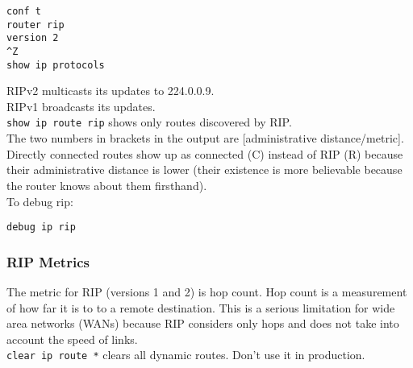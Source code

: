 \begin{verbatim}
conf t
router rip
version 2
^Z
show ip protocols
\end{verbatim}

RIPv2 multicasts its updates to 224.0.0.9.\\

RIPv1 broadcasts its updates.\\

\texttt{show ip route rip} shows only routes discovered by RIP.\\

The two numbers in brackets in the output are [administrative distance/metric].\\

Directly connected routes show up as connected (C) instead of RIP (R) because
their administrative distance is lower (their existence is more believable
because the router knows about them firsthand).\\

To debug rip:

\begin{verbatim}
debug ip rip  
\end{verbatim}

\subsubsection{RIP Metrics}

The metric for RIP (versions 1 and 2) is hop count. Hop count is a measurement
of how far it is to to a remote destination. This is a serious limitation for
wide area networks (WANs) because RIP considers only hops and does not take
into account the speed of links.\\

\texttt{clear ip route *} clears all dynamic routes. Don't use it in
production.
